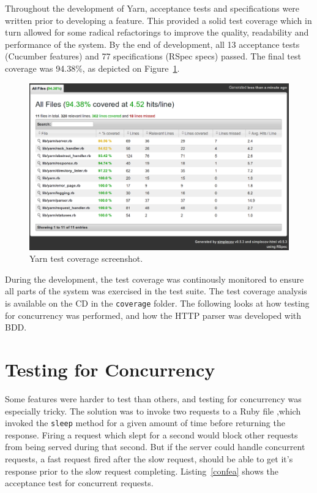 Throughout the development of Yarn, acceptance tests and specifications were
written prior to developing a feature. This provided a solid test coverage
which in turn allowed for some radical refactorings to improve the quality,
readability and performance of the system. By the end of development,
all 13 acceptance tests (Cucumber features) and 77 specifications (RSpec
specs) passed.  The final test coverage was 94.38\%, as depicted on
Figure~\ref{coverage}. 

\begin{figure}[htb]
  \centering
  \includegraphics[width=1.0\textwidth]{img/coverage.png}
  \caption{Yarn test coverage screenshot.}
  \label{coverage}
\end{figure}

During the development, the test coverage was continously monitored to ensure
all parts of the system was exercised in the test suite. The test coverage
analysis is available on the CD in the \texttt{coverage} folder. The following
looks at how testing for concurrency was performed, and how the HTTP parser
was developed with BDD.

\section{Testing for Concurrency}
Some features were harder to test than others, and testing for concurrency was
especially tricky. The solution was to invoke two requests to a Ruby file
,which invoked the \texttt{sleep} method for a given amount of time before
returning the response. Firing a request which slept for a second would block
other requests from being served during that second. But if the server could
handle concurrent requests, a fast request fired after the slow request,
should be able to get it's response prior to the slow request completing.
Listing~\ref{confea} shows the acceptance test for concurrent requests.

